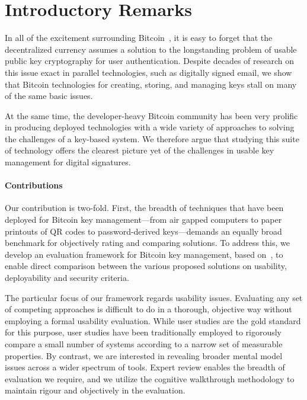 

\section{Introductory Remarks}

In all of the excitement surrounding Bitcoin~\cite{Nak08}, it is easy to forget that the decentralized currency assumes a solution to the longstanding problem of usable public key cryptography for user authentication. Despite decades of research on this issue exact in parallel technologies, such as digitally signed email, we show that Bitcoin technologies for creating, storing, and managing keys stall on many of the same basic issues. 

At the same time, the developer-heavy Bitcoin community has been very prolific in producing deployed technologies with a wide variety of approaches to solving the challenges of a key-based system. We therefore argue that studying this suite of technology offers the clearest picture yet of the challenges in usable key management for digital signatures. 

\paragraph{Contributions}

Our contribution is two-fold. First, the breadth of techniques that have been deployed for Bitcoin key management---from air gapped computers to paper printouts of QR codes to password-derived keys---demands an equally broad benchmark for objectively rating and comparing solutions. To address this, we develop an evaluation framework for Bitcoin key management, based on~\cite{BHOS12}, to enable direct comparison between the various proposed solutions on usability, deployability and security criteria.

The particular focus of our framework regards usability issues. Evaluating any set of competing approaches is difficult to do in a thorough, objective way without employing a formal usability evaluation. While user studies are the gold standard for this purpose, user studies have been traditionally employed to rigorously compare a small number of systems according to a narrow set of measurable properties. By contrast, we are interested in revealing broader mental model issues across a wider spectrum of tools. Expert review enables the breadth of evaluation we require, and we utilize the cognitive walkthrough methodology to maintain rigour and objectively in the evaluation. 

